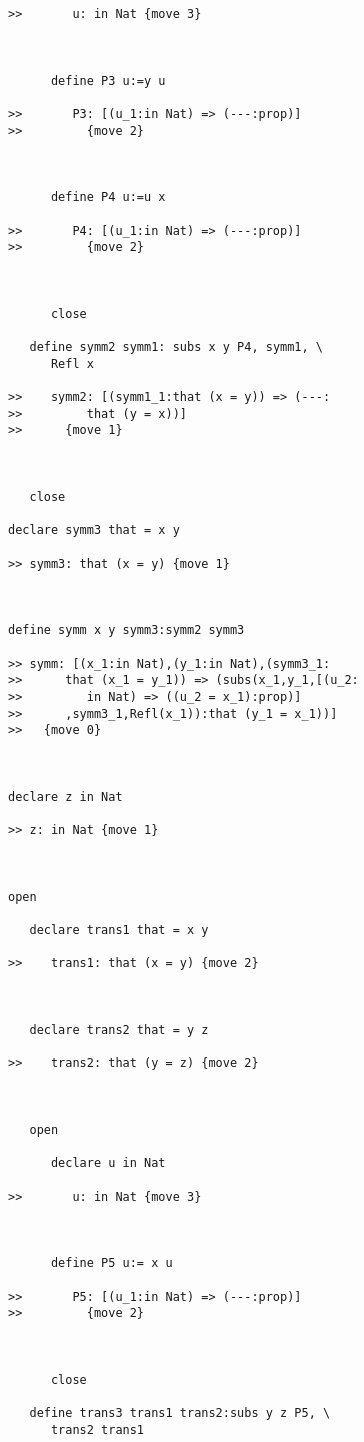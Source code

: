\begin{verbatim}
>>       u: in Nat {move 3}



      define P3 u:=y u

>>       P3: [(u_1:in Nat) => (---:prop)]
>>         {move 2}



      define P4 u:=u x

>>       P4: [(u_1:in Nat) => (---:prop)]
>>         {move 2}



      close

   define symm2 symm1: subs x y P4, symm1, \
      Refl x

>>    symm2: [(symm1_1:that (x = y)) => (---:
>>         that (y = x))]
>>      {move 1}



   close

declare symm3 that = x y

>> symm3: that (x = y) {move 1}



define symm x y symm3:symm2 symm3

>> symm: [(x_1:in Nat),(y_1:in Nat),(symm3_1:
>>      that (x_1 = y_1)) => (subs(x_1,y_1,[(u_2:
>>         in Nat) => ((u_2 = x_1):prop)]
>>      ,symm3_1,Refl(x_1)):that (y_1 = x_1))]
>>   {move 0}



declare z in Nat

>> z: in Nat {move 1}



open

   declare trans1 that = x y

>>    trans1: that (x = y) {move 2}



   declare trans2 that = y z

>>    trans2: that (y = z) {move 2}



   open

      declare u in Nat

>>       u: in Nat {move 3}



      define P5 u:= x u

>>       P5: [(u_1:in Nat) => (---:prop)]
>>         {move 2}



      close

   define trans3 trans1 trans2:subs y z P5, \
      trans2 trans1


\end{verbatim}
